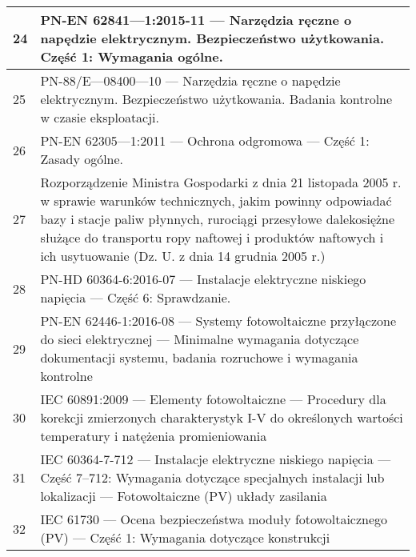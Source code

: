 {\begin{tabular}{ | p{} | p{} | }
        24 & PN-EN 62841—1:2015-11 — Narzędzia ręczne o napędzie elektrycznym. Bezpieczeństwo użytkowania. Część 1: Wymagania ogólne.                                                                                                                                                                                \\ \hline
        25 & PN-88/E—08400—10 — Narzędzia ręczne o napędzie elektrycznym. Bezpieczeństwo użytkowania. Badania kontrolne w czasie eksploatacji.                                                                                                                                                                       \\ \hline
        26 & PN-EN 62305—1:2011 — Ochrona odgromowa — Część 1: Zasady ogólne.                                                                                                                                                                                                                                        \\ \hline
        27 & Rozporządzenie Ministra Gospodarki z dnia 21 listopada 2005 r. w sprawie warunków technicznych, jakim powinny odpowiadać bazy i stacje paliw płynnych, rurociągi przesyłowe dalekosiężne służące do transportu ropy naftowej i produktów naftowych i ich usytuowanie (Dz. U. z dnia 14 grudnia 2005 r.) \\ \hline
        28 & PN-HD 60364-6:2016-07 — Instalacje elektryczne niskiego napięcia — Część 6: Sprawdzanie.                                                                                                                                                                                                                \\ \hline
        29 & PN-EN 62446-1:2016-08 — Systemy fotowoltaiczne przyłączone do sieci elektrycznej — Minimalne wymagania dotyczące dokumentacji systemu, badania rozruchowe i wymagania kontrolne                                                                                                                         \\ \hline
        30 & IEC 60891:2009 — Elementy fotowoltaiczne — Procedury dla korekcji zmierzonych charakterystyk I-V do określonych wartości temperatury i natężenia promieniowania                                                                                                                                         \\ \hline
        31 & IEC 60364-7-712 — Instalacje elektryczne niskiego napięcia — Część 7–712: Wymagania dotyczące specjalnych instalacji lub lokalizacji — Fotowoltaiczne (PV) układy zasilania                                                                                                                             \\ \hline
        32 & IEC 61730 — Ocena bezpieczeństwa moduły fotowoltaicznego (PV) — Część 1: Wymagania dotyczące konstrukcji                                                                                                                                                                                                \\ \hline
    \end{tabular}
}